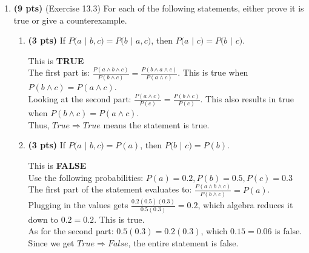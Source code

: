 \documentclass{article}
\begin{document}
\begin{enumerate}
\item \textbf{(9 pts)} (Exercise 13.3) For each of the following statements, either prove it is true or give a counterexample.

    \begin{enumerate}[label=($\alph*$)]


    \item \textbf{(3 pts)} If $P(a$ $|$ $b,c) = P(b$ $|$ $a,c)$, then $P(a$ $|$ $c) = P(b$ $|$ $c)$.

    \color{blue}
        This is \textbf{TRUE}\\
        The first part is: $\frac{P(a \wedge b \wedge c)}{P(b \wedge c)} = \frac{P(b \wedge a \wedge c)}{P(a \wedge c)}$. This is true when $P(b \wedge c) = P(a \wedge c)$.\\
        Looking at the second part: $\frac{P(a \wedge c)}{P(c)} = \frac{P(b \wedge c)}{P(c)}$. This also results in true when $P(b \wedge c) = P(a \wedge c)$.\\
        Thus, $True \Rightarrow True$ means the statement is true.
    \color{black}



    \item \textbf{(3 pts)} If $P(a$ $|$ $b,c) = P(a)$, then $P(b$ $|$ $c) = P(b)$.

    \color{blue}
        This is \textbf{FALSE}\\
        Use the following probabilities: $P(a)=0.2, P(b)=0.5, P(c)=0.3$\\
        The first part of the statement evaluates to: $\frac{P(a \wedge b \wedge c)}{P(b \wedge c)} = P(a)$. Plugging in the values gets $\frac{0.2(0.5)(0.3)}{0.5(0.3)} = 0.2$, which algebra reduces it down to $0.2 = 0.2$. This is true.\\
        As for the second part: $0.5(0.3) = 0.2(0.3)$, which $0.15 = 0.06$ is false.\\
        Since we get $True \Rightarrow False$, the entire statement is false.
    \color{black}




\end{enumerate}
\end{enumerate}
\end{document}
